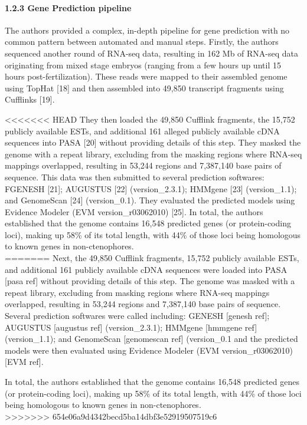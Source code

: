 \documentclass[
]{article}
\begin{document}
\hypertarget{gene-prediction-pipeline}{%
\paragraph{1.2.3 Gene Prediction
pipeline}\label{gene-prediction-pipeline}}

The authors provided a complex, in-depth pipeline for gene prediction
with no common pattern between automated and manual steps. Firstly, the
authors sequenced another round of RNA-seq data, resulting in 162 Mb of
RNA-seq data originating from mixed stage embryos (ranging from a few
hours up until 15 hours post-fertilization). These reads were mapped to
their assembled genome using TopHat {[}18{]} and then assembled into
49,850 transcript fragments using Cufflinks {[}19{]}.

\textless\textless\textless\textless\textless\textless\textless{} HEAD
They then loaded the 49,850 Cufflink fragments, the 15,752 publicly
available ESTs, and additional 161 alleged publicly available cDNA
sequences into PASA {[}20{]} without providing details of this step.
They masked the genome with a repeat library, excluding from the masking
regions where RNA-seq mappings overlapped, resulting in 53,244 regions
and 7,387,140 base pairs of sequence. This data was then submitted to
several prediction softwares: FGENESH {[}21{]}; AUGUSTUS {[}22{]}
(version\_2.3.1); HMMgene {[}23{]} (version\_1.1); and GenomeScan
{[}24{]} (version\_0.1). They evaluated the predicted models using
Evidence Modeler (EVM version\_r03062010) {[}25{]}. In total, the
authors established that the genome contains 16,548 predicted genes (or
protein-coding loci), making up 58\% of its total length, with 44\% of
those loci being homologous to known genes in non-ctenophores.\\
======= Next, the 49,850 Cufflink fragments, 15,752 publicly available
ESTs, and additional 161 publicly available cDNA sequences were loaded
into PASA {[}pasa ref{]} without providing details of this step. The
genome was masked with a repeat library, excluding from masking regions
where RNA-seq mappings overlapped, resulting in 53,244 regions and
7,387,140 base pairs of sequence. Several prediction softwares were
called including: GENESH {[}genesh ref{]}; AUGUSTUS {[}augustus ref{]}
(version\_2.3.1); HMMgene {[}hmmgene ref{]} (version\_1.1); and
GenomeScan {[}genomescan ref{]} (version\_0.1 and the predicted models
were then evaluated using Evidence Modeler (EVM version\_r03062010)
{[}EVM ref{]}.

In total, the authors established that the genome contains 16,548
predicted genes (or protein-coding loci), making up 58\% of its total
length, with 44\% of those loci being homologous to known genes in
non-ctenophores.\\
\textgreater\textgreater\textgreater\textgreater\textgreater\textgreater\textgreater{}
654e06a9d4342becd5ba14dbf3e52919507519c6
\end{document}
